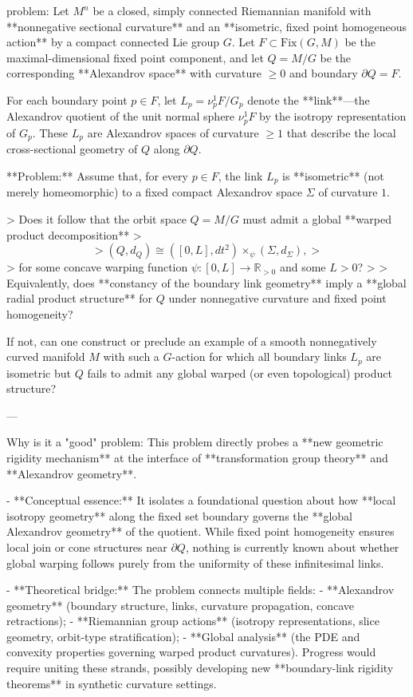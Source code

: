 problem:  
Let \(M^n\) be a closed, simply connected Riemannian manifold with **nonnegative sectional curvature** and an **isometric, fixed point homogeneous action** by a compact connected Lie group \(G\). Let \(F\subset \mathrm{Fix}(G,M)\) be the maximal-dimensional fixed point component, and let \(Q = M/G\) be the corresponding **Alexandrov space** with curvature \(\ge 0\) and boundary \(\partial Q = F\).  

For each boundary point \(p \in F\), let \(L_p = \nu_p^1 F / G_p\) denote the **link**—the Alexandrov quotient of the unit normal sphere \(\nu_p^1 F\) by the isotropy representation of \(G_p\). These \(L_p\) are Alexandrov spaces of curvature \(\ge 1\) that describe the local cross-sectional geometry of \(Q\) along \(\partial Q\).  

**Problem:**  
Assume that, for every \(p \in F\), the link \(L_p\) is **isometric** (not merely homeomorphic) to a fixed compact Alexandrov space \(\Sigma\) of curvature \(1\).  

> Does it follow that the orbit space \(Q = M/G\) must admit a global **warped product decomposition**
> \[
>  (Q,d_Q) \cong ([0,L],dt^2) \times_\psi (\Sigma,d_{\Sigma}),
> \]
> for some concave warping function \(\psi:[0,L]\to \mathbb{R}_{>0}\) and some \(L>0\)?  
>
> Equivalently, does **constancy of the boundary link geometry** imply a **global radial product structure** for \(Q\) under nonnegative curvature and fixed point homogeneity?

If not, can one construct or preclude an example of a smooth nonnegatively curved manifold \(M\) with such a \(G\)-action for which all boundary links \(L_p\) are isometric but \(Q\) fails to admit any global warped (or even topological) product structure?  

---

Why is it a "good" problem:  
This problem directly probes a **new geometric rigidity mechanism** at the interface of **transformation group theory** and **Alexandrov geometry**.  

- **Conceptual essence:** It isolates a foundational question about how **local isotropy geometry** along the fixed set boundary governs the **global Alexandrov geometry** of the quotient. While fixed point homogeneity ensures local join or cone structures near \(\partial Q\), nothing is currently known about whether global warping follows purely from the uniformity of these infinitesimal links.  

- **Theoretical bridge:** The problem connects multiple fields:  
  - **Alexandrov geometry** (boundary structure, links, curvature propagation, concave retractions);  
  - **Riemannian group actions** (isotropy representations, slice geometry, orbit-type stratification);  
  - **Global analysis** (the PDE and convexity properties governing warped product curvatures).  
  Progress would require uniting these strands, possibly developing new **boundary-link rigidity theorems** in synthetic curvature settings.  

